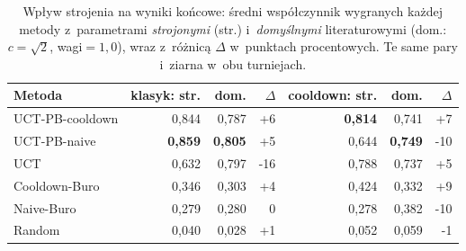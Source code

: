 \begin{table}[H]
\centering
\small
\begin{tabular}{lrrrrrr}
\toprule
Metoda & klasyk: str. & dom. & $\Delta$ & cooldown: str. & dom. & $\Delta$ \\
\midrule
UCT-PB-cooldown & 0,844 & 0,787 & +6 & \textbf{0,814} & 0,741 & +7 \\
UCT-PB-naive & \textbf{0,859} & \textbf{0,805} & +5 & 0,644 & \textbf{0,749} & -10 \\
UCT & 0,632 & 0,797 & -16 & 0,788 & 0,737 & +5 \\
Cooldown-Buro & 0,346 & 0,303 & +4 & 0,424 & 0,332 & +9 \\
Naive-Buro & 0,279 & 0,280 & 0 & 0,278 & 0,382 & -10 \\
Random & 0,040 & 0,028 & +1 & 0,052 & 0,059 & -1 \\
\bottomrule
\end{tabular}
\caption{Wpływ strojenia na wyniki końcowe: średni współczynnik wygranych każdej metody z~parametrami \emph{strojonymi} (str.) i~\emph{domyślnymi} literaturowymi (dom.: $c{=}\sqrt2$, wagi${=}1{,}0$), wraz z~różnicą $\Delta$ w~punktach procentowych. Te same pary i~ziarna w~obu turniejach.}
\label{tab:tuning-influence}
\end{table}